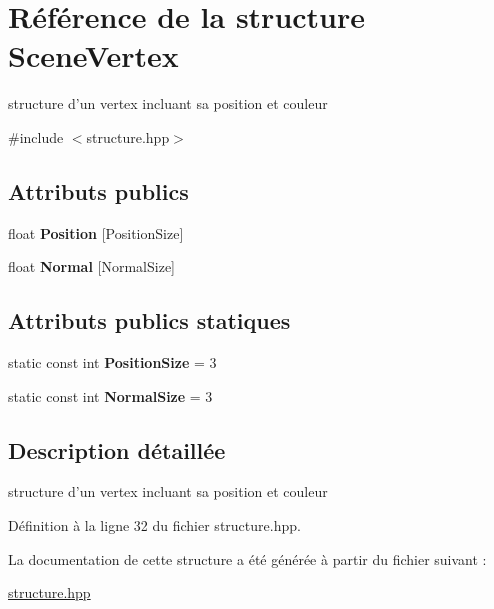 \hypertarget{structSceneVertex}{\section{Référence de la structure Scene\+Vertex}
\label{structSceneVertex}
}


structure d'un vertex incluant sa position et couleur  




{\ttfamily \#include $<$structure.\+hpp$>$}

\subsection*{Attributs publics}
\begin{DoxyCompactItemize}
\item 
\hypertarget{structSceneVertex_a3b2fe4c69d1330e393abcae994fdfed9}{float {\bfseries Position} \mbox{[}Position\+Size\mbox{]}}\label{structSceneVertex_a3b2fe4c69d1330e393abcae994fdfed9}

\item 
\hypertarget{structSceneVertex_acdc6802a278814acb106b2f5f066be67}{float {\bfseries Normal} \mbox{[}Normal\+Size\mbox{]}}\label{structSceneVertex_acdc6802a278814acb106b2f5f066be67}

\end{DoxyCompactItemize}
\subsection*{Attributs publics statiques}
\begin{DoxyCompactItemize}
\item 
\hypertarget{structSceneVertex_a4c6d899962f4aa76b72a1b60bf27b289}{static const int {\bfseries Position\+Size} = 3}\label{structSceneVertex_a4c6d899962f4aa76b72a1b60bf27b289}

\item 
\hypertarget{structSceneVertex_aa5cd1fa3294a54df201053c577f35ea7}{static const int {\bfseries Normal\+Size} = 3}\label{structSceneVertex_aa5cd1fa3294a54df201053c577f35ea7}

\end{DoxyCompactItemize}


\subsection{Description détaillée}
structure d'un vertex incluant sa position et couleur 

Définition à la ligne 32 du fichier structure.\+hpp.



La documentation de cette structure a été générée à partir du fichier suivant \+:\begin{DoxyCompactItemize}
\item 
\hyperlink{structure_8hpp}{structure.\+hpp}\end{DoxyCompactItemize}
